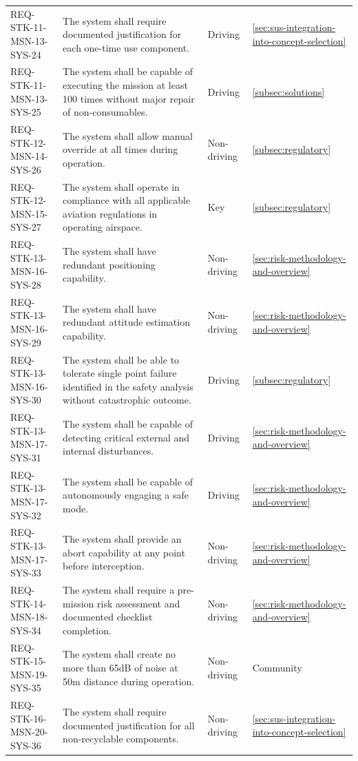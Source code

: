 \begin{xltabular}{\textwidth}{p{0.16\textwidth} p{0.5\textwidth} X p{0.1\textwidth}}
REQ-STK-11-MSN-13-SYS-24 & The system shall require documented justification for each one-time use component. & Driving & \ref{sec:sus-integration-into-concept-selection} \\ 
REQ-STK-11-MSN-13-SYS-25 & The system shall be capable of executing the mission at least 100 times without major repair of non-consumables. & Driving &  \ref{subsec:solutions}\\ 
REQ-STK-12-MSN-14-SYS-26 & The system shall allow manual override at all times during operation. & Non-driving &  \ref{subsec:regulatory}\\ 
REQ-STK-12-MSN-15-SYS-27 & The system shall operate in compliance with all applicable aviation regulations in operating airspace. & Key & \ref{subsec:regulatory} \\ 
REQ-STK-13-MSN-16-SYS-28 & The system shall have redundant positioning capability. & Non-driving &  \ref{sec:risk-methodology-and-overview}\\ 
REQ-STK-13-MSN-16-SYS-29 & The system shall have redundant attitude estimation capability. & Non-driving &  \ref{sec:risk-methodology-and-overview}\\ 
REQ-STK-13-MSN-16-SYS-30 & The system shall be able to tolerate single point failure identified in the safety analysis without catastrophic outcome. & Driving &  \ref{subsec:regulatory}\\ 
REQ-STK-13-MSN-17-SYS-31 & The system shall be capable of detecting critical external and internal disturbances. & Driving &  \ref{sec:risk-methodology-and-overview}\\ 
REQ-STK-13-MSN-17-SYS-32 & The system shall be capable of autonomously engaging a safe mode. & Driving &  \ref{sec:risk-methodology-and-overview}\\ 
REQ-STK-13-MSN-17-SYS-33 & The system shall provide an abort capability at any point before interception. & Non-driving &  \ref{sec:risk-methodology-and-overview}\\ 
REQ-STK-14-MSN-18-SYS-34 & The system shall require a pre-mission risk assessment and documented checklist completion. & Non-driving & \ref{sec:risk-methodology-and-overview} \\ 
REQ-STK-15-MSN-19-SYS-35 & The system shall create no more than 65dB of noise at 50m distance during operation. & Non-driving & Community \\ 
REQ-STK-16-MSN-20-SYS-36 & The system shall require documented justification for all non-recyclable components. & Non-driving & \ref{sec:sus-integration-into-concept-selection} \\ 

\end{xltabular}
